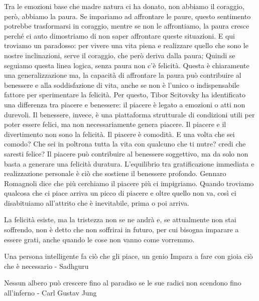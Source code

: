 \documentclass[12pt]{book} %
\begin{document}
Tra le emozioni base che madre natura ci ha donato, non abbiamo il coraggio, però, abbiamo la paura. Se impariamo ad
affrontare le paure, questo sentimento potrebbe trasformarsi in coraggio, mentre se non le affrontiamo, la paura cresce perché
ci auto dimostriamo di non saper affrontare queste situazioni. E qui troviamo un paradosso: per vivere una vita piena e
realizzare quello che sono le nostre inclinazioni, serve il coraggio, che però deriva dalla paura; Quindi se seguiamo
questa linea logica, senza paura non c'è felicità. Questa è chiaramente una generalizzazione ma, la capacità di affrontare la paura può contribuire al benessere e alla soddisfazione di vita, anche se non è l’unico o indispensabile fattore per sperimentare la felicità. Per questo, Tibor Scitovsky ha identificato una differenza tra
piacere e benessere: il piacere è legato a emozioni o atti non durevoli. Il benessere, invece, è una piattaforma
strutturale di condizioni utili per poter essere felici, ma non necessariamente genera piacere. 
Il piacere e il divertimento non sono la felicità. Il piacere è comodità. E una volta che sei comodo? Che sei in poltrona tutta la vita con qualcuno che ti nutre? credi che saresti felice?
Il piacere può contribuire al benessere soggettivo, ma da solo non basta a generare una felicità duratura. L’equilibrio tra gratificazione immediata e realizzazione personale è ciò che sostiene il benessere profondo.
Gennaro Romagnoli dice che più cerchiamo il piacere più ci impigriamo. Quando troviamo qualcosa che ci piace arriva un picco di piacere e oltre quello non va, così ci disabituiamo all'attrito che è inevitabile, prima o poi arriva.

La felicità esiste, ma la tristezza non se ne andrà e, se attualmente non stai soffrendo, non è detto che non soffrirai in futuro, per cui bisogna imparare a essere grati, anche quando le cose non vanno come vorremmo. 

Una persona intelligente fa ciò che gli piace, un genio Impara a fare con gioia ciò che è necessario - Sadhguru

Nessun albero può crescere fino al paradiso se le sue radici non scendono fino all'inferno - Carl Gustav Jung
\end{document}
